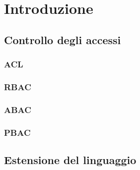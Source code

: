 \chapter{Introduzione}

\section{Controllo degli accessi}
\label{sec:Controllo degli accessi}

\subsection{ACL}
\label{sub:ACL}

\subsection{RBAC}
\label{sub:RBAC}

\subsection{ABAC}
\label{sub:ABAC}

\subsection{PBAC}
\label{sub:PBAC}

\section{Estensione del linguaggio}
\label{sec:Estensione del linguaggio}
